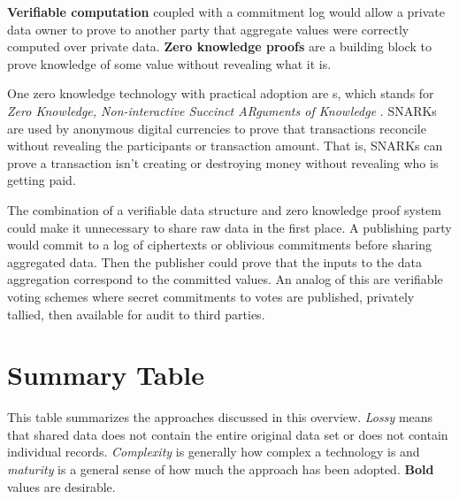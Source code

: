 \documentclass[nobib]{tufte-handout}
\begin{document}
\textbf{Verifiable computation} coupled with a commitment log would allow a
private data owner to prove to another party that aggregate values were correctly
computed over private data. \textbf{Zero knowledge proofs} are a building block
to prove knowledge of some value without revealing what it is.

One zero knowledge technology with practical adoption are s,
which stands for \textit{Zero Knowledge, Non-interactive Succinct ARguments of
Knowledge} \cite{DBLP:conf/sp/Ben-SassonCG0MTV14}. SNARKs are used by anonymous
digital currencies to prove that transactions reconcile without revealing the
participants or transaction amount. That is, SNARKs can prove a transaction
isn’t creating or destroying money without revealing who is getting paid.

The combination of a verifiable data structure and zero knowledge proof system
could make it unnecessary to share raw data in the first place. A publishing
party would commit to a log of ciphertexts or oblivious commitments before
sharing aggregated data. Then the publisher could prove that the inputs to the
data aggregation correspond to the committed values. An analog of this are
verifiable voting schemes where secret commitments to votes are published,
privately tallied, then available for audit to third parties.

\section{Summary Table}

This table summarizes the approaches discussed in this overview.
\textit{Lossy} means that shared data does not contain the entire original
data set or does not contain individual records. \textit{Complexity} is
generally how complex a technology is and \textit{maturity} is a general
sense of how much the approach has been adopted. \textbf{Bold} values are
desirable.
\end{document}
